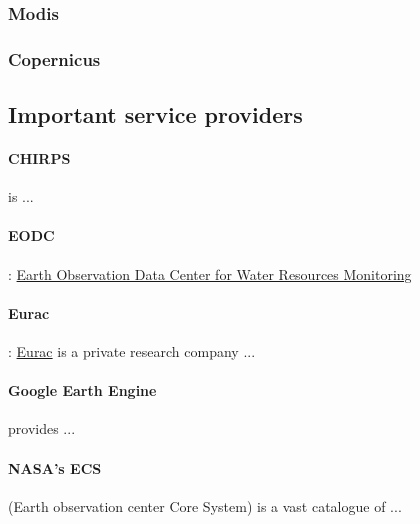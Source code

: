 \subsubsection{Modis}

\subsubsection{Copernicus}


\subsection{Important service providers}

\paragraph{CHIRPS} is ...

\paragraph{EODC}: \href{https://www.eodc.eu/}{Earth Observation Data Center for Water Resources Monitoring}

\paragraph{Eurac}: \href{http://www.eurac.edu}{Eurac} is a private research company ...

\paragraph{Google Earth Engine} provides ...

\paragraph{NASA's ECS} (Earth observation center Core System) is a vast catalogue of ...
